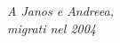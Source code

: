 \begin{flushright}
\null{}
\textit{A  Janos  e  Andreea, \\ 
    migrati  nel  2004}
 \null
\end{flushright}
